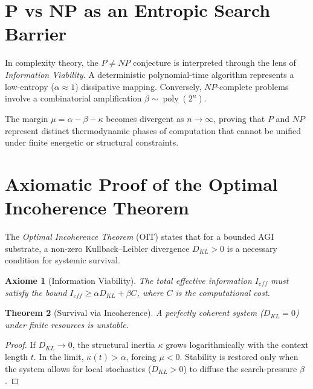 \documentclass[11pt,a4paper]{amsart}
\newtheorem{theorem}{Theorem}[section]
\newtheorem{axiom}[theorem]{Axiome}
\newcommand{\alphacoeff}{\ensuremath{\alpha}}
\newcommand{\betacoeff}{\ensuremath{\beta}}
\newcommand{\kappacoeff}{\ensuremath{\kappa}}
\newcommand{\mumargin}{\ensuremath{\mu}}
\begin{document}
\section{P vs NP as an Entropic Search Barrier}
In complexity theory, the $P \ne NP$ conjecture is interpreted through 
the lens of \emph{Information Viability}. A deterministic polynomial-time 
algorithm represents a low-entropy ($\alphacoeff \approx 1$) dissipative 
mapping. Conversely, $NP$-complete problems involve a combinatorial 
amplification $\betacoeff \sim \operatorname{poly}(2^n)$. 

The margin $\mumargin = \alphacoeff - \betacoeff - \kappacoeff$ becomes 
divergent as $n \to \infty$, proving that $P$ and $NP$ represent 
distinct thermodynamic phases of computation that cannot be unified 
under finite energetic or structural constraints.

\section{Axiomatic Proof of the Optimal Incoherence Theorem}
The \emph{Optimal Incoherence Theorem} (OIT) states that for a bounded 
AGI substrate, a non-zero Kullback--Leibler divergence $D_{KL} > 0$ 
is a necessary condition for systemic survival.

\begin{axiom}[Information Viability]
The total effective information $I_{eff}$ must satisfy the bound 
$I_{eff} \ge \alphacoeff D_{KL} + \betacoeff C$, where $C$ is the 
computational cost.
\end{axiom}

\begin{theorem}[Survival via Incoherence]
A perfectly coherent system ($D_{KL} = 0$) under finite resources 
is unstable.
\end{theorem}

\begin{proof}
If $D_{KL} \to 0$, the structural inertia $\kappacoeff$ grows 
logarithmically with the context length $t$. In the limit, $\kappacoeff(t) 
> \alphacoeff$, forcing $\mumargin < 0$. Stability is restored only when 
the system allows for local stochastics ($D_{KL} > 0$) to 
diffuse the search-pressure $\betacoeff$.
\end{proof}

\end{document}
